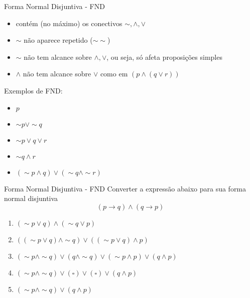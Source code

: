 \begin{frame}[t]{Forma Normal Disjuntiva - FND}
	\begin{itemize}
	\item contém (no máximo) os conectivos $\sim, \wedge, \vee$
	\item $\sim$ não aparece repetido ($\sim\sim$)
	\item $\sim$ não tem alcance sobre $\wedge, \vee$, ou seja, só afeta proposições simples
	\item $\wedge$ não tem alcance sobre $\vee$ como em $(p \wedge (q \vee r))$
	\end{itemize}

	Exemplos de FND:

	\begin{itemize}
	\item $p$
	\item $\sim p \vee\sim q$
	\item $\sim p \vee q \vee r$
	\item $\sim q \wedge r$
	\item $(\sim p \wedge q) \vee (\sim q \wedge\sim r)$
	\end{itemize}
\end{frame}

\begin{frame}[t]{Forma Normal Disjuntiva - FND}
	Converter a expressão abaixo para sua forma normal disjuntiva $$(p \rightarrow q) \wedge (q \rightarrow p)$$

	\vskip 0.25cm

	\begin{enumerate}
	\item $(\sim p \vee q) \wedge (\sim q \vee p)$
	\item $((\sim p \vee q) \wedge \sim q) \vee ((\sim p \vee q) \wedge p)$
	\item $(\sim p \wedge \sim q) \vee (q \wedge \sim q) \vee (\sim p \wedge p) \vee (q \wedge p)$
	\item $(\sim p \wedge \sim q) \vee (\square) \vee (\square) \vee (q \wedge p)$
	\item $(\sim p \wedge \sim q) \vee (q \wedge p)$
	\end{enumerate}
\end{frame}

